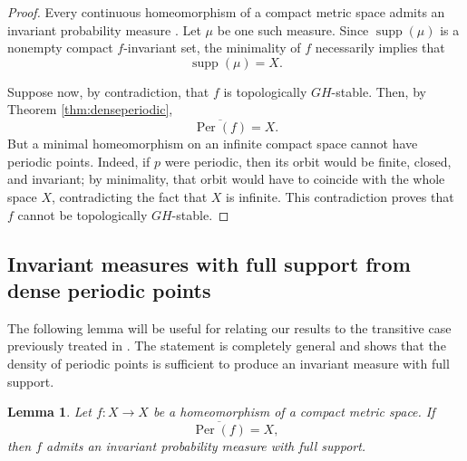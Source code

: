 \documentclass{amsart}
\numberwithin{equation}{section}
\newtheorem{lemma}[theorem]{Lemma}
\theoremstyle{remark}
\DeclareMathOperator{\supp}{supp}
\DeclareMathOperator{\Per}{Per}
\begin{document}
\begin{proof}
Every continuous homeomorphism of a compact metric space admits an invariant probability measure \cite{walters1982}. Let $\mu$ be one such measure. Since $\supp(\mu)$ is a nonempty compact $f$-invariant set, the minimality of $f$ necessarily implies that
\[
\supp(\mu)=X.
\]

Suppose now, by contradiction, that $f$ is topologically $GH$-stable. Then, by Theorem \ref{thm:denseperiodic},
\[
\overline{\Per(f)}=X.
\]
But a minimal homeomorphism on an infinite compact space cannot have periodic points. Indeed, if $p$ were periodic, then its orbit would be finite, closed, and invariant; by minimality, that orbit would have to coincide with the whole space $X$, contradicting the fact that $X$ is infinite. This contradiction proves that $f$ cannot be topologically $GH$-stable.
\end{proof}

\subsection{Invariant measures with full support from dense periodic points}

The following lemma will be useful for relating our results to the transitive case previously treated in \cite{cubas2018propriedades}. The statement is completely general and shows that the density of periodic points is sufficient to produce an invariant measure with full support.

\begin{lemma}\label{lem:denseperiodic_fullsupport}
Let $f:X\to X$ be a homeomorphism of a compact metric space. If
\[
\overline{\Per(f)}=X,
\]
then $f$ admits an invariant probability measure with full support.
\end{lemma}
\end{document}
